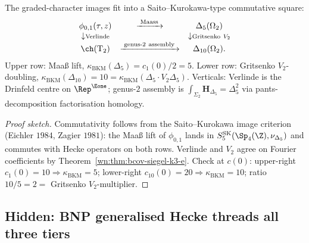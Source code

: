 \begin{proposition}
\label{prop:wave6-x2-character-compat}
The graded-character images fit into a Saito--Kurokawa-type
commutative square:
\begin{equation*}
\begin{array}{ccc}
\phi_{0, 1}(\tau, z) &
\xrightarrow{\;\mathrm{Maass}\;} &
\Delta_5(\Omega_2) \\
\downarrow\scriptstyle{\mathrm{Verlinde}} & &
\downarrow\scriptstyle{\mathrm{Gritsenko}\ V_2} \\
\ch(\mathrm T_2) &
\xrightarrow{\;\text{genus-}2\ \text{assembly}\;} &
\Delta_{10}(\Omega_2).
\end{array}
\end{equation*}
Upper row: Maa{\ss} lift,
$\kappa_{\mathrm{BKM}}(\Delta_5) = c_1(0) / 2 = 5$. Lower row:
Gritsenko $V_2$-doubling,
$\kappa_{\mathrm{BKM}}(\Delta_{10}) = 10 =
\kappa_{\mathrm{BKM}}(\Delta_5 \cdot V_2 \Delta_5)$. Verticals:
Verlinde is the Drinfeld centre on $\Rep^{\Eone}$; genus-$2$
assembly is $\int_{\Sigma_2} \mathbf H_{\Delta_5} = \Delta_5^2$
via pants-decomposition factorisation homology.
\end{proposition}

\begin{proof}[Proof sketch]
Commutativity follows from the Saito--Kurokawa image criterion
(Eichler $1984$, Zagier $1981$): the Maa{\ss} lift of
$\phi_{0, 1}$ lands in $S_5^{\mathrm{SK}}(\Sp_4(\Z),
\nu_{\Delta_5})$ and commutes with Hecke operators on both
rows. Verlinde and $V_2$ agree on Fourier coefficients by
Theorem~\ref{wn:thm:bcov-siegel-k3-e}. Check at $c(0)$:
upper-right $c_1(0) = 10 \Rightarrow \kappa_{\mathrm{BKM}} =
5$; lower-right $c_{10}(0) = 20 \Rightarrow
\kappa_{\mathrm{BKM}} = 10$; ratio $10 / 5 = 2 = $ Gritsenko
$V_2$-multiplier.
\end{proof}

\subsection{Hidden: BNP generalised Hecke threads all three
tiers}
\label{subsec:wave6-x2-hidden-bnp}

